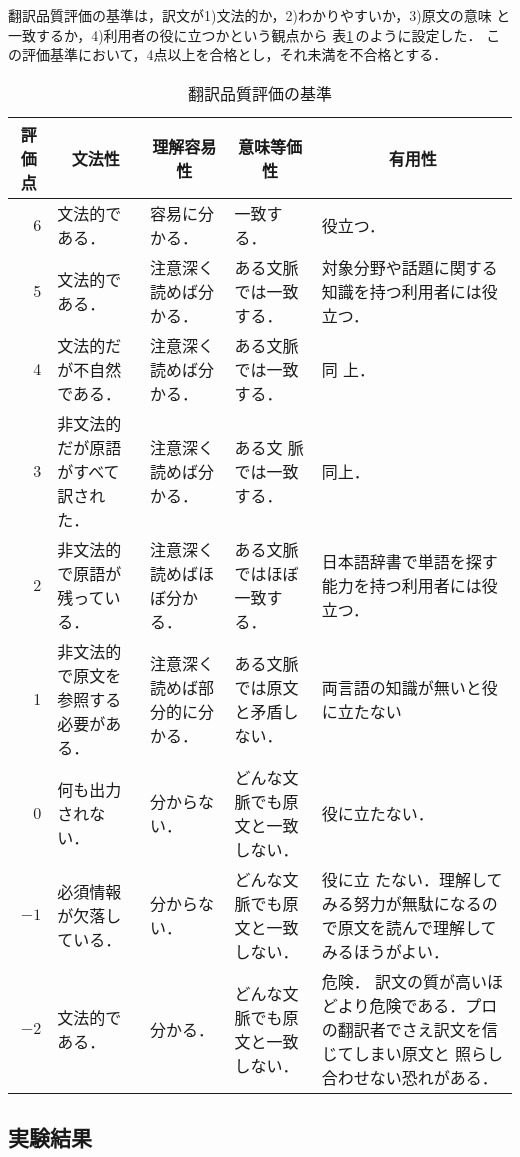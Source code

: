 翻訳品質評価の基準は，訳文が1)文法的か，2)わかりやすいか，3)原文の意味
と一致するか，4)利用者の役に立つかという観点から
表\ref{tab:eval_criterion}\,のように設定した．
この評価基準において，4点以上を合格とし，それ未満を不合格とする．
\begin{table}[tbhp]
\caption{翻訳品質評価の基準}
\label{tab:eval_criterion}
\begin{center}
\begin{tabular}{|r||p{}|p{}|p{}|p{}|}\hline
\multicolumn{1}{|c||}{評価点}&
\multicolumn{1}{c|}{文法性}&
\multicolumn{1}{c|}{理解容易性}&
\multicolumn{1}{c|}{意味等価性}&
\multicolumn{1}{c|}{有用性}\\\hline\hline
6   & 文法的である．& 容易に分かる．& 一致する．& 役立つ．\\\hline
5   & 文法的である．& 注意深く読めば分かる．& ある文脈では一致する．&
対象分野や話題に関する知識を持つ利用者には役立つ．\\\hline
4   & 文法的だが不自然である．& 注意深く読めば分かる．& ある文脈では一致する．& 同
上．\\\hline
3   & 非文法的だが原語がすべて訳された．& 注意深く読めば分かる．& ある文
脈では一致する．& 同上．\\\hline
2   & 非文法的で原語が残っている．& 注意深く読めばほぼ分かる．& ある文脈ではほぼ一致する．&
日本語辞書で単語を探す能力を持つ利用者には役立つ．\\\hline
1   & 非文法的で原文を参照する必要がある．& 注意深く読めば部分的に分かる．
& ある文脈では原文と矛盾しない．& 両言語の知識が無いと役に立たない\\\hline
0   & 何も出力されない．& 分からない．& どんな文脈でも原文と一致しない．& 役に立たない．\\\hline
$-1$& 必須情報が欠落している．& 分からない．& どんな文脈でも原文と一致しない．& 役に立
たない．理解してみる努力が無駄になるので原文を読んで理解してみるほうがよい．\\\hline
$-2$& 文法的である．& 分かる．&  どんな文脈でも原文と一致しない．& 危険．
訳文の質が高いほどより危険である．プロの翻訳者でさえ訳文を信じてしまい原文と
照らし合わせない恐れがある．\\\hline
\end{tabular}
\end{center}
\end{table}

\subsection{実験結果}

